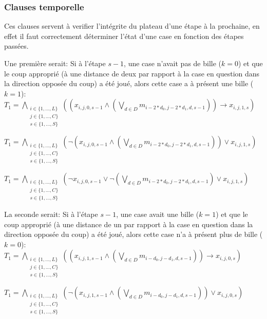 \documentclass[utf8]{article}
\begin{document}
\subsubsection{Clauses temporelle}
Ces clauses servent à verifier l'intégrite du plateau d'une étape à la prochaine, en effet il faut correctement déterminer l'état d'une case en fonction des étapes passées. \newline

Une première serait: Si à l'étape $s-1$, une case n'avait pas de bille ($k=0$) et que le coup approprié (à une distance de deux par rapport à la case en question dans la direction opposée du coup) a été joué, alors cette case a à présent une bille ($k=1$):\newline
$T_1 = {\underset{\substack{i\in\{1,...,L\} \\ j\in\{1,...,C\} \\ s\in \{1,...,S\}}}{\bigwedge}}((x_{i,j,0,s-1} \wedge ({\underset{d\in D}{\bigvee}}m_{i-2*d_0,j-2*d_1,d,s-1}))\rightarrow x_{i,j,1,s})$\newline

$T_1 = {\underset{\substack{i\in\{1,...,L\} \\ j\in\{1,...,C\} \\ s\in \{1,...,S\}}}{\bigwedge}}(\neg(x_{i,j,0,s-1} \wedge ({\underset{d\in D}{\bigvee}}m_{i-2*d_0,j-2*d_1,d,s-1}))\vee x_{i,j,1,s})$\newline

$T_1 = {\underset{\substack{i\in\{1,...,L\} \\ j\in\{1,...,C\} \\ s\in \{1,...,S\}}}{\bigwedge}}(\neg x_{i,j,0,s-1} \vee \neg({\underset{d\in D}{\bigvee}}m_{i-2*d_0,j-2*d_1,d,s-1})\vee x_{i,j,1,s})$\newline

La seconde serait: Si à l'étape $s-1$, une case avait une bille ($k=1$) et que le coup approprié (à une distance de un par rapport à la case en question dans la direction opposée du coup) a été joué, alors cette case n'a à présent plus de bille ($k=0$): \newline
$T_1 = {\underset{\substack{i\in\{1,...,L\} \\ j\in\{1,...,C\} \\ s\in \{1,...,S\}}}{\bigwedge}}((x_{i,j,1,s-1} \wedge ({\underset{d\in D}{\bigvee}}m_{i-d_0,j-d_1,d,s-1}))\rightarrow x_{i,j,0,s})$\newline

$T_1 = {\underset{\substack{i\in\{1,...,L\} \\ j\in\{1,...,C\} \\ s\in \{1,...,S\}}}{\bigwedge}}(\neg(x_{i,j,1,s-1} \wedge ({\underset{d\in D}{\bigvee}}m_{i-d_0,j-d_1,d,s-1}))\vee x_{i,j,0,s})$\newline
\end{document}
